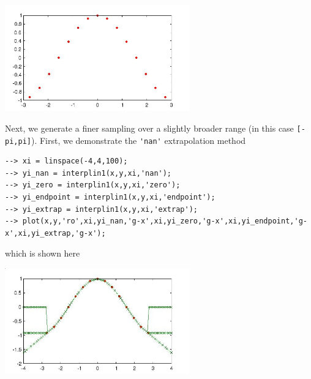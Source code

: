 \centerline{\includegraphics[width=8cm]{interplin1_1}}

Next, we generate a finer sampling over a slightly broader range
(in this case \verb|[-pi,pi]|).  First, we demonstrate the \verb|'nan'| 
extrapolation method
\begin{verbatim}
--> xi = linspace(-4,4,100);
--> yi_nan = interplin1(x,y,xi,'nan');
--> yi_zero = interplin1(x,y,xi,'zero');
--> yi_endpoint = interplin1(x,y,xi,'endpoint');
--> yi_extrap = interplin1(x,y,xi,'extrap');
--> plot(x,y,'ro',xi,yi_nan,'g-x',xi,yi_zero,'g-x',xi,yi_endpoint,'g-x',xi,yi_extrap,'g-x');
\end{verbatim}
which is shown here


\centerline{\includegraphics[width=8cm]{interplin1_2}}

